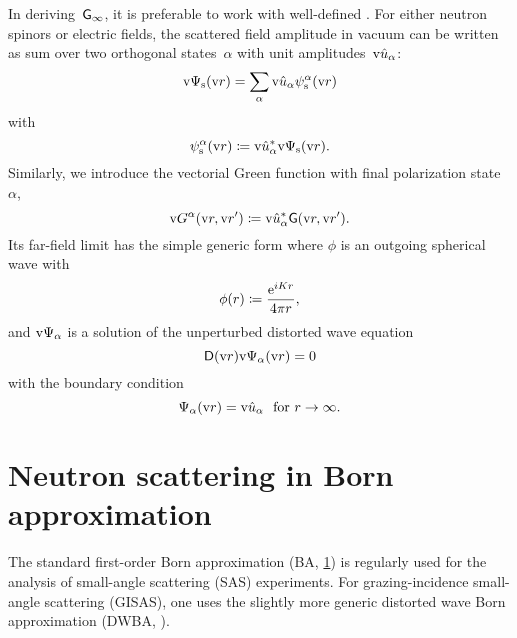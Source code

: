 In deriving~$\mathsf{G}_\infty$, it is preferable to work with well-defined
.
%
For either neutron spinors or electric fields,
the scattered field amplitude in vacuum
can be written as sum over two orthogonal states~$\alpha$
%
with unit amplitudes~$\text{v}{\hat u}_\alpha$:
%
\begin{equation}
   \text{v}\Psi_\text{s}(\text{v}{r})
   = \sum_\alpha\text{v}{\hat u}_\alpha\psi_\text{s}^\alpha(\text{v}{r})
\end{equation}
with
\begin{equation}
  \psi_\text{s}^\alpha(\text{v}{r})
  \coloneqq \text{v}{\hat u}_\alpha^* \text{v}\Psi_\text{s}(\text{v}{r}).
\end{equation}
Similarly, we introduce the vectorial Green function with final polarization state~$\alpha$,
\begin{equation}
   \text{v}{G}^\alpha(\text{v}{r},\text{v}{r}')
   \coloneqq \text{v}{\hat u}_\alpha^* \mathsf{G}(\text{v}{r},\text{v}{r}').
\end{equation}
Its far-field limit has the simple generic form
where $\phi$ is an outgoing spherical wave with
\begin{equation}\label{Effphidef}
  \phi(r) \coloneqq \frac{\mathrm e^{iKr}}{4\pi r},
\end{equation}
and $\text{v}\Psi_\alpha$ is a solution of the unperturbed distorted wave equation
\begin{equation}
  \mathsf{D}(\text{v}{r})\text{v}\Psi_\alpha(\text{v}{r}) = 0
\end{equation}
with the boundary condition
\begin{equation}
  \Psi_\alpha(\text{v}{r}) = \text{v}{\hat u}_\alpha\text{~~for }r\to\infty.
\end{equation}

\section{Neutron scattering in Born approximation}\label{SBornApprox}

The standard first-order Born approximation (BA, \cref{SBornApprox})
is regularly used  for the analysis of small-angle scattering (SAS) experiments.
%
%
%
For grazing-incidence small-angle scattering (GISAS),
one uses the slightly more generic distorted wave Born approximation (DWBA, ).
%


